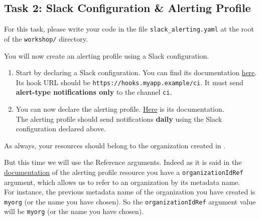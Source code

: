 \subsection{Task 2: Slack Configuration \& Alerting Profile}\label{sec:slack\_alerting}

\begin{note}
For this task, please write your code in the file \texttt{slack\_alerting.yaml}
at the root of the \texttt{workshop/} directory.
\end{note}

You will now create an alerting profile using a Slack configuration.

\begin{enumerate}
  \item Start by declaring a Slack configuration.
  You can find its documentation \href{https://doc.crds.dev/github.com/itera-io/provider-jet-taikun/slackconfiguration.taikun.jet.crossplane.io/Configuration/v1alpha1}{here}.\\

Its hook URL should be \texttt{https://hooks.myapp.example/ci}.
It must send \textbf{alert-type notifications only} to the channel \texttt{ci}.
  \item You can now declare the alerting profile.
    \href{https://doc.crds.dev/github.com/itera-io/provider-jet-taikun/alertingprofile.taikun.jet.crossplane.io/Profile/v1alpha1}{Here} is its documentation.\\
    The alerting profile should send notifications \textbf{daily} using the Slack configuration declared above.
\end{enumerate}

\begin{warn}
As always, your resources should belong to the organization created in
.
\end{warn}

But this time we will use the Reference arguments. Indeed as it is said in the \href{https://doc.crds.dev/github.com/itera-io/provider-jet-taikun/alertingprofile.taikun.jet.crossplane.io/Profile/v1alpha1}{documentation} of the alerting profile resource you have a \texttt{organizationIdRef} argument, which allows us to refer to an organization by its metadata name.\\

For instance, the previous metadata name of the organization you have created is \texttt{myorg} (or the name you have chosen). So the \texttt{organizationIdRef} argument value will be \texttt{myorg} (or the name you have chosen).\\

